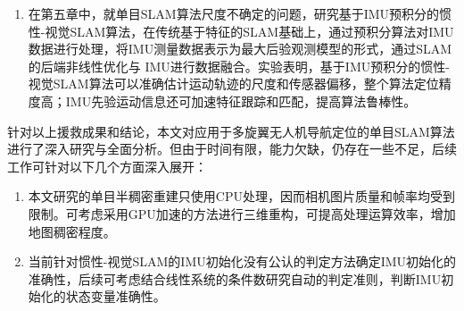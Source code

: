 \begin{conclusion}
\begin{enumerate}  [label={(\arabic*)}]
\item 在第五章中，就单目SLAM算法尺度不确定的问题，研究基于IMU预积分的惯性-视觉SLAM算法，在传统基于特征的SLAM基础上，通过预积分算法对IMU数据进行处理，将IMU测量数据表示为最大后验观测模型的形式，通过SLAM的后端非线性优化与
IMU进行数据融合。实验表明，基于IMU预积分的惯性-视觉SLAM算法可以准确估计运动轨迹的尺度和传感器偏移，整个算法定位精度高；IMU先验运动信息还可加速特征跟踪和匹配，提高算法鲁棒性。
\end{enumerate}


针对以上援救成果和结论，本文对应用于多旋翼无人机导航定位的单目SLAM算法进行了深入研究与全面分析。但由于时间有限，能力欠缺，仍存在一些不足，后续工作可针对以下几个方面深入展开：

\begin{enumerate}  [label={(\arabic*)}]
\item 本文研究的单目半稠密重建只使用CPU处理，因而相机图片质量和帧率均受到限制。可考虑采用GPU加速的方法进行三维重构，可提高处理运算效率，增加地图稠密程度。

\item 当前针对惯性-视觉SLAM的IMU初始化没有公认的判定方法确定IMU初始化的准确性，后续可考虑结合线性系统的条件数研究自动的判定准则，判断IMU初始化的状态变量准确性。

\end{enumerate}





\end{conclusion}